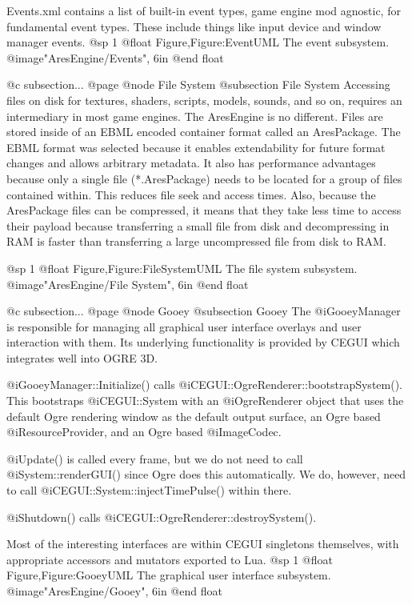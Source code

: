 Events.xml contains a list of built-in event types, game engine mod agnostic, for fundamental event types. These include things like input device and window manager events.
@sp 1
@float Figure,Figure:EventUML
The event subsystem.
@image{"AresEngine/Events", 6in}
@end float

@c subsection...
@page 
@node File System
@subsection File System
Accessing files on disk for textures, shaders, scripts, models, sounds, and so on, requires an intermediary in most game engines. The AresEngine is no different. Files are stored inside of an EBML encoded container format called an AresPackage. The EBML format was selected because it enables extendability for future format changes and allows arbitrary metadata. It also has performance advantages because only a single file (*.AresPackage) needs to be located for a group of files contained within. This reduces file seek and access times. Also, because the AresPackage files can be compressed, it means that they take less time to access their payload because transferring a small file from disk and decompressing in RAM is faster than transferring a large uncompressed file from disk to RAM.
            
@sp 1
@float Figure,Figure:FileSystemUML
The file system subsystem.
@image{"AresEngine/File System", 6in}
@end float

@c subsection...
@page 
@node Gooey
@subsection Gooey
The @i{GooeyManager} is responsible for managing all graphical user interface overlays and user interaction with them. Its underlying functionality is provided by CEGUI which integrates well into OGRE 3D.

@i{GooeyManager::Initialize()} calls @i{CEGUI::OgreRenderer::bootstrapSystem()}. This bootstraps @i{CEGUI::System} with an @i{OgreRenderer} object that uses the default Ogre rendering window as the default output surface, an Ogre based @i{ResourceProvider}, and an Ogre based @i{ImageCodec}.

@i{Update()} is called every frame, but we do not need to call @i{System::renderGUI()} since Ogre does this automatically. We do, however, need to call @i{CEGUI::System::injectTimePulse()} within there.

@i{Shutdown()} calls @i{CEGUI::OgreRenderer::destroySystem()}.

Most of the interesting interfaces are within CEGUI singletons themselves, with appropriate accessors and mutators exported to Lua.
@sp 1
@float Figure,Figure:GooeyUML
The graphical user interface subsystem.
@image{"AresEngine/Gooey", 6in}
@end float

